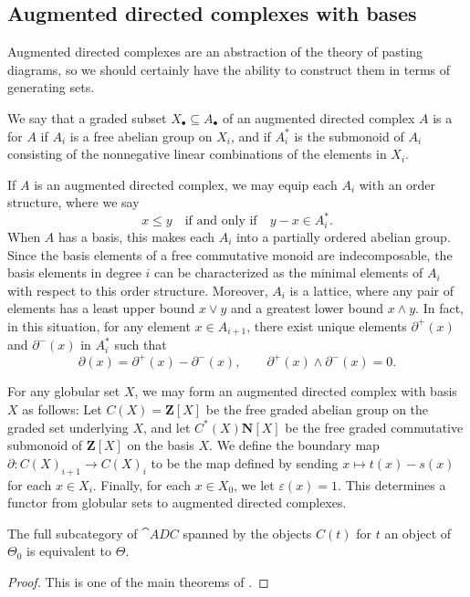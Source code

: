 \subsection{Augmented directed complexes with bases}
Augmented directed complexes are an abstraction of the theory of pasting diagrams, so we should certainly have the ability to construct them in terms of generating sets.
\begin{defn}
We say that a graded subset \(X_\bullet\subseteq A_\bullet\) of an augmented directed complex \(A\) is a  for \(A\) if \(A_i\) is a free abelian group on \(X_i\), and if \(A^\ast_i\) is the submonoid of \(A_i\) consisting of the nonnegative linear combinations of the elements in \(X_i\).  
\end{defn}
If \(A\) is an augmented directed complex, we may equip each \(A_i\) with an order structure, where we say \[x \leq y \quad \text{if and only if} \quad y-x \in A^\ast_i.\]  
When \(A\) has a basis, this makes each \(A_i\) into a partially ordered abelian group.  Since the basis elements of a free commutative monoid are indecomposable, the basis elements in degree \(i\)  can be characterized as the minimal elements of \(A_i\) with respect to this order structure.  Moreover, \(A_i\) is a lattice, where any pair of elements has a least upper bound \(x\vee y\) and a greatest lower bound \(x\wedge y\).  In fact, in this situation, for any element \(x\in A_{i+1}\), there exist unique elements \(\partial^+(x)\) and \(\partial^-(x)\) in \(A^*_i\) such that \[\partial(x)=\partial^+(x) - \partial^-(x), \qquad \partial^+(x) \wedge \partial^-(x) = 0.\]

For any globular set \(X\), we may form an augmented directed complex with basis \(X\) as follows: Let \(C(X)=\mathbf{Z}[X]\) be the free graded abelian group on the graded set underlying \(X\), and let \(C^\ast(X)\mathbf{N}[X]\) be the free graded commutative submonoid of \(\mathbf{Z}[X]\) on the basis \(X\).    We define the boundary map \(\partial: C(X)_{i+1} \to C(X)_i\) to be the map defined by sending \(x\mapsto t(x)-s(x)\) for each \(x\in X_i\).  Finally, for each \(x\in X_0\), we let \(\varepsilon(x)=1\).  This determines a functor from globular sets to augmented directed complexes.  

\begin{thm} The full subcategory of \(\cat{ADC}\) spanned by the objects \(C(t)\) for \(t\) an object of \(\Theta_0\) is equivalent to \(\Theta\).  
\end{thm}
\begin{proof} This is one of the main theorems of \cite{steinersimple}.
\end{proof}

